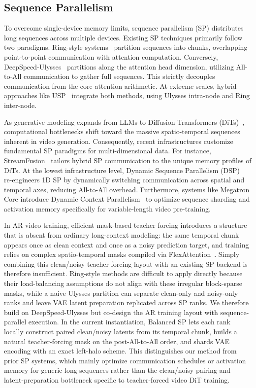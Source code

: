 \subsection{Sequence Parallelism}
To overcome single-device memory limits, sequence parallelism (SP) distributes long sequences across multiple devices. Existing SP techniques primarily follow two paradigms. Ring-style systems~\cite{li2023sequence, liu2023ring, liu2024startrail, gu2024loongtrain, longvila, longrl} partition sequences into chunks, overlapping point-to-point communication with attention computation. Conversely, DeepSpeed-Ulysses~\cite{jacobs2023deepspeed} partitions along the attention head dimension, utilizing All-to-All communication to gather full sequences. This strictly decouples communication from the core attention arithmetic. At extreme scales, hybrid approaches like USP~\cite{fang2024usp} integrate both methods, using Ulysses intra-node and Ring inter-node.

As generative modeling expands from LLMs to Diffusion Transformers (DiTs)~\cite{peebles2023scalable, ma2024latte}, computational bottlenecks shift toward the massive spatio-temporal sequences inherent in video generation. 
Consequently, recent infrastructures customize fundamental SP paradigms for multi-dimensional data. 
For instance, StreamFusion~\cite{yang2026streamfusion} tailors hybrid SP communication to the unique memory profiles of DiTs. 
At the lowest infrastructure level, Dynamic Sequence Parallelism (DSP)~\cite{zhao2024dsp} re-engineers 1D SP by dynamically switching communication across spatial and temporal axes, reducing All-to-All overhead. 
Furthermore, systems like Megatron Core introduce Dynamic Context Parallelism~\cite{nvidia2026dynamiccp} to optimize sequence sharding and activation memory specifically for variable-length video pre-training.


In AR video training, efficient mask-based teacher forcing introduces a structure that is absent from ordinary long-context modeling: the same temporal chunk appears once as clean context and once as a noisy prediction target, and training relies on complex spatio-temporal masks compiled via FlexAttention~\cite{dong2024flex}.
Simply combining this clean/noisy teacher-forcing layout with an existing SP backend is therefore insufficient.
Ring-style methods are difficult to apply directly because their load-balancing assumptions do not align with these irregular block-sparse masks, while a naive Ulysses partition can separate clean-only and noisy-only ranks and leave VAE latent preparation replicated across SP ranks.
We therefore build on DeepSpeed-Ulysses but co-design the AR training layout with sequence-parallel execution. In the current instantiation, Balanced SP lets each rank locally construct paired clean/noisy latents from its temporal chunk, builds a natural teacher-forcing mask on the post-All-to-All order, and shards VAE encoding with an exact left-halo scheme.
This distinguishes our method from prior SP systems, which mainly optimize communication schedules or activation memory for generic long sequences rather than the clean/noisy pairing and latent-preparation bottleneck specific to teacher-forced video DiT training.


